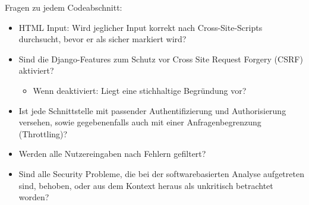 \documentclass[accentcolor=tud0b,12pt,paper=a4]{tudreport}
\begin{document}
Fragen zu jedem Codeabschnitt:
\begin{multicols}{2}
\begin{itemize}
	\renewcommand{\labelitemi}{\scriptsize$\square$}
	\renewcommand{\labelitemii}{\scriptsize$\square$}
    \item HTML Input: Wird jeglicher Input korrekt nach Cross-Site-Scripts durchsucht, bevor er als sicher markiert wird?
    \item Sind die Django-Features zum Schutz vor Cross Site Request Forgery (CSRF) aktiviert?
    \begin{itemize}
    	\item Wenn deaktiviert: Liegt eine stichhaltige Begründung vor?
    \end{itemize}
    \item Ist jede Schnittstelle mit passender Authentifizierung und Authorisierung versehen, sowie gegebenenfalls auch mit einer Anfragenbegrenzung (Throttling)?
    \item Werden alle Nutzereingaben nach Fehlern gefiltert?
    \item Sind alle Security Probleme, die bei der softwarebasierten Analyse aufgetreten sind, behoben, oder aus dem Kontext heraus als unkritisch betrachtet worden?
\end{itemize}
\end{multicols}
\pagebreak
\end{document}
